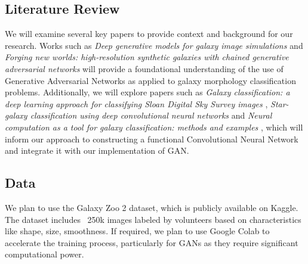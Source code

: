 \subsection{Literature Review}

We will examine several key papers to provide context and background for our research. 
Works such as \textit{Deep generative models for galaxy image simulations} \cite{Lanusse21} and 
\textit{Forging new worlds: high-resolution synthetic galaxies with chained generative adversarial networks} \cite{Fussell19} 
will provide a foundational understanding of the use of Generative Adversarial Networks as applied to galaxy morphology classification problems. 
Additionally, we will explore papers such as \textit{Galaxy classification: a deep learning approach for classifying Sloan Digital Sky Survey images} \cite{Gharat22}, 
\textit{Star-galaxy classification using deep convolutional neural networks} \cite{Kim16}
and \textit{Neural computation as a tool for galaxy classification: methods and examples} \cite{Lahav96}, 
which will inform our approach to constructing a functional Convolutional Neural Network and integrate it with our implementation of GAN.

\subsection{Data}
We plan to use the Galaxy Zoo 2 dataset, which is publicly available on Kaggle. 
The dataset includes ~250k images labeled by volunteers based on characteristics like shape, size, smoothness. 
If required, we plan to use Google Colab to accelerate the training process, particularly for GANs as they require significant computational power.


